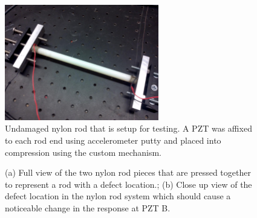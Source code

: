 \begin{figure}[ht!]
\centering
\includegraphics[width=0.6\textwidth]{eps_pics/nylonUncrackedFull}
\caption{Undamaged nylon rod that is setup for testing. A PZT was affixed to each rod end using accelerometer putty and placed into compression using the custom mechanism.
 	 \label{fig:nylonUncrackedFull}} 
\end{figure}

\begin{figure}
\begin{subfigmatrix}{2}
\end{subfigmatrix}

   \caption[all]
   { \label{fig:nylonCrack}
(a) Full view of the two nylon rod pieces that are pressed together to represent a rod with a defect location.;
(b) Close up view of the defect location in the nylon rod system which should cause a noticeable change in the response at PZT B.
 }
   \end{figure}
   
